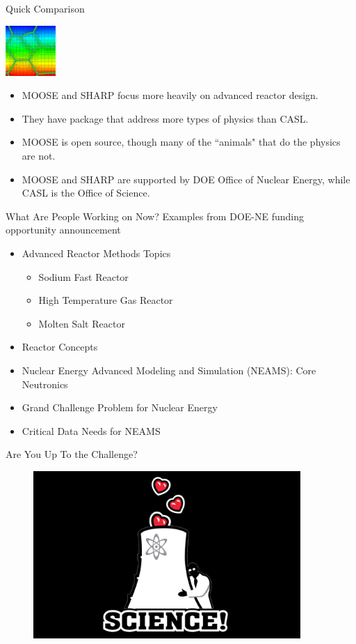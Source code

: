 \documentclass[xcolor=x11names,compress, handout]{beamer}
\renewcommand{\(}{\begin{columns}}
\renewcommand{\)}{\end{columns}}
\newcommand{\<}[1]{\begin{column}{#1}}
\renewcommand{\>}{\end{column}}
\begin{document}
\begin{frame}{Quick Comparison}
\begin{center}
\includegraphics[height=0.75in,clip]{moose}
\end{center}
\begin{itemize}
\item MOOSE and SHARP focus more heavily on advanced reactor design.
\item They have package that address more types of physics than CASL.
\item MOOSE is open source, though many of the ``animals" that do the physics are not.
\item MOOSE and SHARP are supported by DOE Office of Nuclear Energy, while CASL is the Office of Science.
\end{itemize}
\end{frame}


\begin{frame}{What Are People Working on Now?}
Examples from DOE-NE funding opportunity announcement
\begin{itemize}
\item Advanced Reactor Methods Topics
  \begin{itemize}
  \item Sodium Fast Reactor
  \item High Temperature Gas Reactor
  \item Molten Salt Reactor
  \end{itemize}
\item Reactor Concepts
\item Nuclear Energy Advanced Modeling and Simulation (NEAMS): Core Neutronics
\item Grand Challenge Problem for Nuclear Energy
\item Critical Data Needs for NEAMS
\end{itemize}

\end{frame}


\begin{frame}{Are You Up To the Challenge?}
\begin{figure}
\includegraphics[height=2.5in,clip]{science}
\end{figure}
\end{frame}
\end{document}
